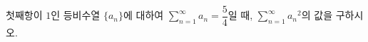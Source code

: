 첫째항이 $1$인 등비수열 $\{a_n\}$에 대하여 $\displaystyle\sum_{n=1}^{\infty} a_n=\dfrac{5}{4}$일 때, $\displaystyle\sum_{n=1}^{\infty} {a_n}^2$의 값을 구하시오.
